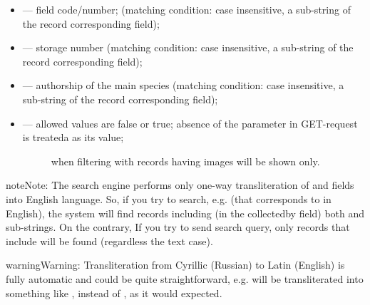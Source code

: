 \documentclass[letterpaper,10pt,english]{sphinxmanual}
\begin{document}
\begin{itemize}
\item {} 
 — field code/number; (matching condition: case insensitive, a sub-string of the record corresponding field);

\item {} 
 — storage number (matching condition: case insensitive, a sub-string of the record corresponding field);

\item {} 
 — authorship of the main species (matching condition: case insensitive, a sub-string of the record corresponding field);

\item {} \begin{description}
\item[{ — allowed values are false or true; absence of the parameter in GET-request is treateda as its  value;}] \leavevmode
when filtering with  records having images will be shown only.

\end{description}

\end{itemize}

\begin{sphinxadmonition}{note}{Note:}
The search engine performs only one-way transliteration of
 and  fields into English language.
So, if you try to search, e.g.  (that corresponds to  in English),
the system will find  records including (in the collectedby field)
both  and  sub-strings.
On the contrary, If you try to send  search query, only
records that include  will be found  (regardless the text case).
\end{sphinxadmonition}

\begin{sphinxadmonition}{warning}{Warning:}
Transliteration from Cyrillic (Russian) to Latin (English)
is fully automatic
and could be quite straightforward,
e.g.  will be transliterated into something like ,
instead of , as it would expected.
\end{sphinxadmonition}
\end{document}
